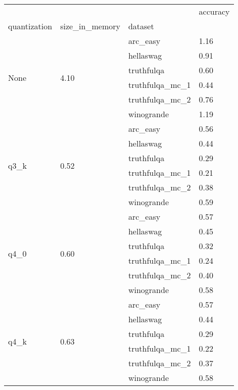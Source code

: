 \begin{tabular}{llll}
\toprule
 &  &  & accuracy \\
quantization & size\_in\_memory & dataset &  \\
\midrule
\multirow[t]{6}{*}{None} & \multirow[t]{6}{*}{4.10} & arc\_easy & 1.16 \\
 &  & hellaswag & 0.91 \\
 &  & truthfulqa & 0.60 \\
 &  & truthfulqa\_mc\_1 & 0.44 \\
 &  & truthfulqa\_mc\_2 & 0.76 \\
 &  & winogrande & 1.19 \\
\cline{1-4} \cline{2-4}
\multirow[t]{6}{*}{q3\_k} & \multirow[t]{6}{*}{0.52} & arc\_easy & 0.56 \\
 &  & hellaswag & 0.44 \\
 &  & truthfulqa & 0.29 \\
 &  & truthfulqa\_mc\_1 & 0.21 \\
 &  & truthfulqa\_mc\_2 & 0.38 \\
 &  & winogrande & 0.59 \\
\cline{1-4} \cline{2-4}
\multirow[t]{6}{*}{q4\_0} & \multirow[t]{6}{*}{0.60} & arc\_easy & 0.57 \\
 &  & hellaswag & 0.45 \\
 &  & truthfulqa & 0.32 \\
 &  & truthfulqa\_mc\_1 & 0.24 \\
 &  & truthfulqa\_mc\_2 & 0.40 \\
 &  & winogrande & 0.58 \\
\cline{1-4} \cline{2-4}
\multirow[t]{6}{*}{q4\_k} & \multirow[t]{6}{*}{0.63} & arc\_easy & 0.57 \\
 &  & hellaswag & 0.44 \\
 &  & truthfulqa & 0.29 \\
 &  & truthfulqa\_mc\_1 & 0.22 \\
 &  & truthfulqa\_mc\_2 & 0.37 \\
 &  & winogrande & 0.58 \\
\cline{1-4} \cline{2-4}
\bottomrule
\end{tabular}
